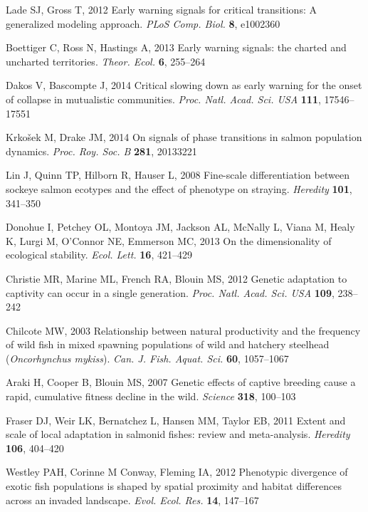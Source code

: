 \documentclass{revtex4}
\begin{document}
\begin{thebibliography}{10}
Lade SJ, Gross T, 2012 {Early warning signals for critical transitions: A
  generalized modeling approach}.
\newblock \emph{PLoS Comp. Biol.} \textbf{8}, e1002360

Boettiger C, Ross N, Hastings A, 2013 {Early warning signals: the charted and
  uncharted territories}.
\newblock \emph{Theor. Ecol.} \textbf{6}, 255--264

Dakos V, Bascompte J, 2014 {Critical slowing down as early warning for the
  onset of collapse in mutualistic communities}.
\newblock \emph{Proc. Natl. Acad. Sci. USA} \textbf{111}, 17546--17551

Krko{\v s}ek M, Drake JM, 2014 {On signals of phase transitions in salmon
  population dynamics}.
\newblock \emph{Proc. Roy. Soc. B} \textbf{281}, 20133221

Lin J, Quinn TP, Hilborn R, Hauser L, 2008 {Fine-scale differentiation between
  sockeye salmon ecotypes and the effect of phenotype on straying}.
\newblock \emph{Heredity} \textbf{101}, 341--350

Donohue I, Petchey OL, Montoya JM, Jackson AL, McNally L, Viana M, Healy K,
  Lurgi M, O'Connor NE, Emmerson MC, 2013 {On the dimensionality of ecological
  stability.}
\newblock \emph{Ecol. Lett.} \textbf{16}, 421--429

Christie MR, Marine ML, French RA, Blouin MS, 2012 {Genetic adaptation to
  captivity can occur in a single generation.}
\newblock \emph{Proc. Natl. Acad. Sci. USA} \textbf{109}, 238--242

Chilcote MW, 2003 {Relationship between natural productivity and the frequency
  of wild fish in mixed spawning populations of wild and hatchery steelhead
  (\emph{Oncorhynchus mykiss})}.
\newblock \emph{Can. J. Fish. Aquat. Sci.} \textbf{60}, 1057--1067

Araki H, Cooper B, Blouin MS, 2007 {Genetic effects of captive breeding cause a
  rapid, cumulative fitness decline in the wild}.
\newblock \emph{Science} \textbf{318}, 100--103

Fraser DJ, Weir LK, Bernatchez L, Hansen MM, Taylor EB, 2011 {Extent and scale
  of local adaptation in salmonid fishes: review and meta-analysis.}
\newblock \emph{Heredity} \textbf{106}, 404--420

Westley PAH, { Corinne M Conway}, Fleming IA, 2012 {Phenotypic divergence of
  exotic fish populations is shaped by spatial proximity and habitat
  differences across an invaded landscape}.
\newblock \emph{Evol. Ecol. Res.} \textbf{14}, 147--167


\end{thebibliography}
\end{document}

